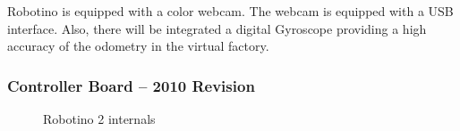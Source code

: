 \documentclass[12pt,twoside]{article}
\begin{document}
\begin{appendix}
Robotino is equipped with a color webcam. The webcam is equipped with
a USB interface. Also, there will be integrated a digital Gyroscope
providing a high accuracy of the odometry in the virtual factory.

\subsubsection{Controller Board – 2010 Revision}

\begin{figure}[h]
\centering
{} 
\quad
{}
\caption{Robotino 2 internals}
\label{fig:robotino-2-guts}
\end{figure}


\end{appendix}
\end{document}
